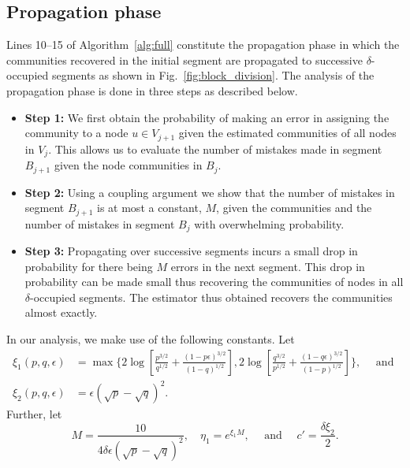 \documentclass[letterpaper,11pt]{article}
\theoremstyle{definition}
\numberwithin{equation}{section}
\newcommand{\eps}{\epsilon}
\theoremstyle{definition}
\numberwithin{equation}{section}
\newcommand{\eps}{\epsilon}
\theoremstyle{thmstyletwo}%
\begin{document}
\subsection{Propagation phase}
\label{sec:propa}
Lines 10--15 of Algorithm~\ref{alg:full} constitute the propagation phase in which the communities recovered in the initial segment are propagated to successive $\delta$-occupied segments as shown in Fig.~\ref{fig:block_division}. The analysis of the propagation phase is done in three steps as described below.
\begin{itemize}
\item \textbf{Step 1:} We first obtain the probability of making an error in assigning the community to a node $u\in V_{j+1}$ given the estimated communities of all nodes in $V_j$. This allows us to evaluate the number of mistakes made in segment $B_{j+1}$ given the node communities in $B_j$.
\item \textbf{Step 2:} Using a coupling argument we show that the number of mistakes in segment $B_{j+1}$ is at most a constant, $M$, given the communities and the number of mistakes in segment $B_j$ with overwhelming probability.
\item \textbf{Step 3:} Propagating over successive segments incurs a small drop in probability for there being $M$ errors in the next segment. This drop in probability can be made small thus recovering the communities of nodes in all $\delta$-occupied segments. The estimator thus obtained recovers the communities almost exactly. 
\end{itemize}

In our analysis, we make use of the following constants. Let
\begin{align}
\xi_1(p,q,\eps) 
&= 
\max\Bigg\{2\log \left[\frac{p^{3/2}}{q^{1/2}}+\frac{(1-p\eps)^{3/2}}{(1-q)^{1/2}}\right], 
2\log \left[\frac{q^{3/2}}{p^{1/2}}+\frac{(1-q\eps)^{3/2}}{(1-p)^{1/2}}\right]\Bigg\}, 
\quad 
\text{ and } \nonumber\\
\xi_2(p,q,\eps) 
&=
\eps (\sqrt{p}-\sqrt{q})^2.
\label{eq:xi1xi2}
\end{align}
Further, let 
\begin{equation}
M 
=\frac{10}{4\delta \eps(\sqrt{p}-\sqrt{q})^2}, \quad \eta_1 = e^{\xi_1 M}, \quad \text{ and } \quad c'=\frac{\delta \xi_2}{2}.
\label{eq:M}
\end{equation}
\end{document}
